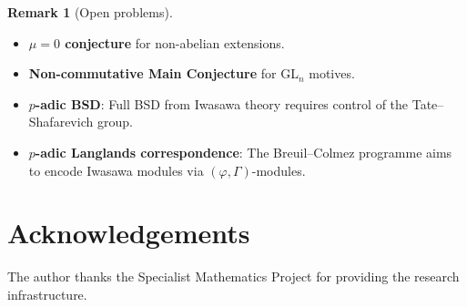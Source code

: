 \documentclass[12pt,a4paper]{amsart}
\theoremstyle{definition}
\newtheorem{remark}[theorem]{Remark}
\begin{document}
\begin{remark}[Open problems]
\begin{itemize}
  \item \textbf{$\mu = 0$ conjecture} for non-abelian extensions.
  \item \textbf{Non-commutative Main Conjecture} for GL$_n$ motives.
  \item \textbf{$p$-adic BSD}: Full BSD from Iwasawa theory requires
    control of the Tate--Shafarevich group.
  \item \textbf{$p$-adic Langlands correspondence}: The Breuil--Colmez
    programme aims to encode Iwasawa modules via $(\varphi,\Gamma)$-modules.
\end{itemize}
\end{remark}

\section*{Acknowledgements}
The author thanks the Specialist Mathematics Project for providing the
research infrastructure.
\end{document}
